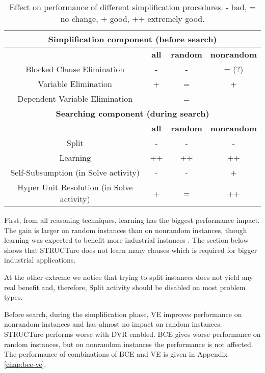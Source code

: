 \begin{table}
  \centering
  \begin{tabular}{| c | c | c | c |}
    \hline
    \multicolumn{4}{|c|}{\textbf{Simplification component (before search)}} \\
    \hline
    & \textbf{all} & \textbf{random} & \textbf{nonrandom} \\
    \hline
    Blocked Clause Elimination & - & - & = (?) \\
    Variable Elimination & + & = & + \\
    Dependent Variable Elimination & - & = & - \\
    \hline
    \hline
    \multicolumn{4}{|c|}{\textbf{Searching component (during search)}} \\
    \hline
    & \textbf{all} & \textbf{random} & \textbf{nonrandom} \\
    \hline
    Split & - & - & - \\
    Learning & ++ & ++ & ++ \\
    Self-Subsumption (in Solve activity) & - & - & + \\
    Hyper Unit Resolution (in Solve activity) & + & = & ++ \\
    \hline
  \end{tabular}

  \caption{Effect on performance of different simplification procedures.
  - bad, = no change, + good, ++ extremely good.}
  \label{tbl:disable}
\end{table}

First, from all reasoning techniques, learning has the biggest
performance impact. The gain is larger on random instances than on
nonrandom instances, though learning was expected to benefit more
industrial instances \cite{DBLP:series/faia/SilvaLM09}. The section
below shows that STRUCTure does not learn many clauses which is
required for bigger industrial applications.

At the other extreme we notice that trying to split instances does not
yield any real benefit and, therefore, Split activity should be disabled
on most problem types.

Before search, during the simplification phase, VE improves
performance on nonrandom instances and has almost no impact on random
instances. STRUCTure performs worse with DVR enabled. BCE gives
worse performance on random instances, but on nonrandom instances
the performance is not affected.  The performance of combinations
of BCE and VE is given in Appendix \ref{chap:bce-ve}.

